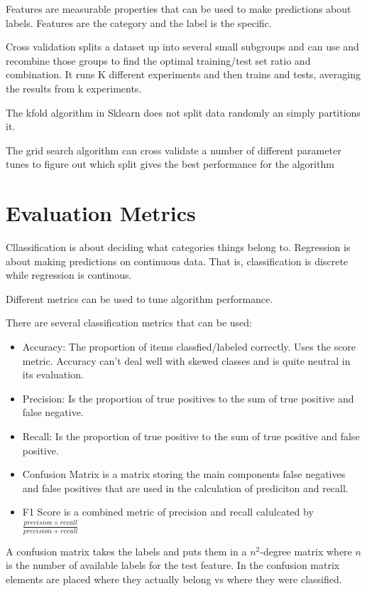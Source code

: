 \documentclass{article}
\begin{document}
Features are measurable properties that can be used to make predictions about
labels. Features are the category and the label is the specific.

Cross validation splits a dataset up into several small subgroups and can use
and recombine those groups to find the optimal training/test set ratio and
combination. It runs K different experiments and then trains and tests,
averaging the results from k experiments.


The kfold algorithm in Sklearn does not split data randomly an simply partitions
it.

The grid search algorithm can cross validate a number of different parameter
tunes to figure out which split gives the best performance for the algorithm

\section{Evaluation Metrics}

Cllassification is about deciding what categories things belong to. Regression
is about making predictions on continuous data. That is, classification is
discrete while regression is continous.

Different metrics can be used to tune algorithm performance.

There are several classification metrics that can be used:
\begin{itemize}
\item Accuracy: The proportion of items classfied/labeled correctly. Uses the
score metric. Accuracy can't deal well with skewed classes and is quite neutral
in its evaluation.
\item Precision: Is the proportion of true positives to the sum of true positive
and false negative.
\item Recall: Is the proportion of true positive to the sum of true positive
and false positive.
\item Confusion Matrix is a matrix storing the main components false negatives
and false positives that are used in the calculation of prediciton and recall.
\item F1 Score is a combined metric of precision and recall calulcated by
$\frac{precision \times recall}{precision + recall}$
\end{itemize}

A confusion matrix takes the labels and puts them in a $n^2$-degree matrix where
$n$ is the number of available labels for the test feature. In the confusion
matrix elements are placed where they actually belong vs where they were
classified.
\end{document}
